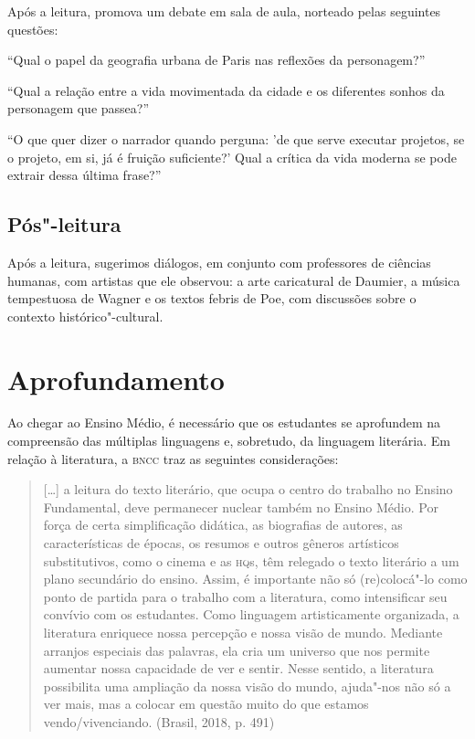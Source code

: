 \documentclass[12pt]{extarticle}
\begin{document}
Após a leitura, promova um debate em sala de aula, norteado pelas seguintes questões:

``Qual o papel da geografia urbana de Paris nas reflexões da personagem?''

``Qual a relação entre a vida movimentada da cidade e os diferentes sonhos da personagem que passea?''

``O que quer dizer o narrador quando perguna: 'de que serve executar projetos, se o projeto, em si, já é fruição suficiente?' Qual a crítica da vida moderna se pode extrair dessa última frase?''

\subsection{Pós"-leitura}

Após a leitura, sugerimos diálogos, em conjunto com
professores de ciências humanas, com artistas que ele observou: a arte
caricatural de Daumier, a música tempestuosa de Wagner e os textos
febris de Poe, com discussões sobre o contexto histórico"-cultural.

\section{Aprofundamento}

Ao chegar ao Ensino Médio, é necessário que os estudantes se aprofundem
na compreensão das múltiplas linguagens e, sobretudo, da linguagem
literária. Em relação à literatura, a \textsc{bncc} traz as seguintes
considerações:

\begin{quote}
{[}\ldots{}{]} a leitura do texto literário, que ocupa o centro do trabalho
no Ensino Fundamental, deve permanecer nuclear também no Ensino Médio.
Por força de certa simplificação didática, as biografias de autores, as
características de épocas, os resumos e outros gêneros artísticos
substitutivos, como o cinema e as \textsc{hq}s, têm relegado o texto literário a
um plano secundário do ensino. Assim, é importante não só (re)colocá"-lo
como ponto de partida para o trabalho com a literatura, como
intensificar seu convívio com os estudantes. Como linguagem
artisticamente organizada, a literatura enriquece nossa percepção e
nossa visão de mundo. Mediante arranjos especiais das palavras, ela cria
um universo que nos permite aumentar nossa capacidade de ver e sentir.
Nesse sentido, a literatura possibilita uma ampliação da nossa visão do
mundo, ajuda"-nos não só a ver mais, mas a colocar em questão muito do
que estamos vendo/vivenciando. (Brasil, 2018, p. 491)
\end{quote}
\end{document}
